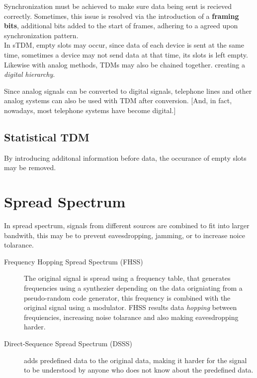 \documentclass[11pt,a4paper,twoside]{book}
\begin{document}
Synchronization must be achieved to make sure data being sent is recieved correctly. Sometimes, this issue is resolved via the introduction of a \textbf{framing bits}, additional bits added to the start of frames, adhering to a agreed upon synchronization pattern.\\

In sTDM, empty slots may occur, since data of each device is sent at the same time, sometimes a device may not send data at that time, its slots is left empty.\\

Likewise with analog methods, TDMs may also be chained together. creating a \textit{digital hierarchy}.

Since analog signals can be converted to digital signals, telephone lines and other analog systems can also be used with TDM after conversion. [And, in fact, nowadays, most telephone systems have become digital.]

\subsection{Statistical TDM}

By introducing additonal information before data, the occurance of empty slots may be removed.

\section{Spread Spectrum}

In spread spectrum, signals from different sources are combined to fit into larger bandwith, this may be to prevent eavesdropping, jamming, or to increase noice tolarance.\\
\begin{description}
\item[Frequency Hopping Spread Spectrum (FHSS)] The original signal is spread using a frequency table, that generates frequencies using a synthezier depending on the data origniating from a pseudo-random code generator, this frequency is combined with the original signal using a modulator. FHSS results data \textit{hopping} between frequiencies, increasing noise tolarance and also making eavesdropping harder.
\item[Direct-Sequence Spread Spectrum (DSSS)] adds predefined data to the original data, making it harder for the signal to be understood by anyone who does not know about the predefined data.
\end{description}
\end{document}
